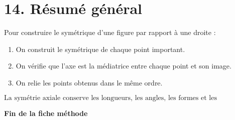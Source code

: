 \documentclass[11pt,a4paper]{article}
\begin{document}
\section*{14. Résumé général}

\begin{retenir}
Pour construire le symétrique d'une figure par rapport à une droite :
\begin{enumerate}[label=\arabic*)]
    \item On construit le symétrique de chaque point important.
    \item On vérifie que l'axe est la médiatrice entre chaque point et son image.
    \item On relie les points obtenus dans le même ordre.
\end{enumerate}
\end{retenir}

\[
\boxed{
\text{La symétrie axiale conserve les longueurs, les angles, les formes et les alignements.}
}
\]

\vspace{0.5cm}

\begin{center}
\textbf{Fin de la fiche méthode}
\end{center}
\end{document}
